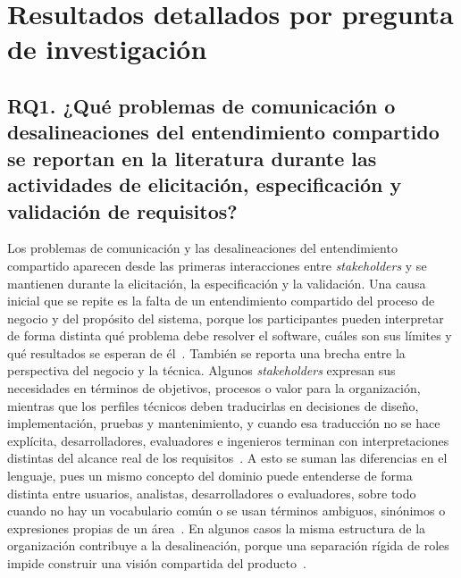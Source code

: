 \documentclass[12pt,letterpaper,oneside]{report}
\begin{document}
\section{Resultados detallados por pregunta de investigación}

\subsection{RQ1. ¿Qué problemas de comunicación o desalineaciones del
entendimiento compartido se reportan en la literatura durante las actividades de
elicitación, especificación y validación de requisitos?}
Los problemas de comunicación y las desalineaciones del entendimiento
compartido aparecen desde las primeras interacciones entre
\textit{stakeholders} y se mantienen durante la elicitación, la especificación
y la validación. Una causa inicial que se repite es la falta de un
entendimiento compartido del proceso de negocio y del propósito del sistema, porque
los participantes pueden interpretar de forma distinta qué problema debe
resolver el software, cuáles son sus límites y qué resultados se esperan de
él~\cite{balasubramaniam2023}. También se reporta una brecha entre la
perspectiva del negocio y la técnica. Algunos \textit{stakeholders} expresan sus
necesidades en términos de objetivos, procesos o valor para la organización,
mientras que los perfiles técnicos deben traducirlas en decisiones de diseño,
implementación, pruebas y mantenimiento, y cuando esa traducción no se hace
explícita, desarrolladores, evaluadores e ingenieros terminan con
interpretaciones distintas del alcance real de los
requisitos~\cite{irshad2021bdd}. A esto se suman las diferencias en el
lenguaje, pues un mismo concepto del dominio puede entenderse de forma distinta
entre usuarios, analistas, desarrolladores o evaluadores, sobre todo cuando no
hay un vocabulario común o se usan términos ambiguos, sinónimos o expresiones
propias de un área~\cite{burkhardt2015}. En algunos casos la misma estructura
de la organización contribuye a la desalineación, porque una separación rígida
de roles impide construir una visión compartida del
producto~\cite{fuller2021blurring}.
\end{document}
